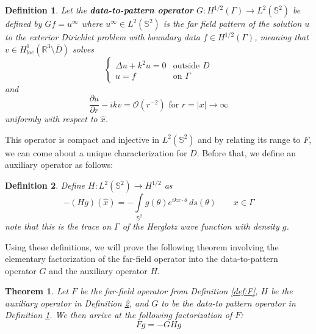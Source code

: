 \documentclass[]{article}
\newtheorem{theorem}{Theorem}
\newtheorem{definition}{Definition}
\newcommand{\bd}{\textbf}
\newcommand{\R}{\mathbb R}
\renewcommand{\S}{\mathbb S}
\begin{document}
				\begin{definition}\label{def:G}
					Let the \bd{data-to-pattern operator} $G: H^{1/2}(\Gamma)\to L^2(\S^2)$ be defined by $Gf = u^\infty$ where $u^\infty \in L^2(\S^2)$ is the far field pattern of the solution $u$ to the exterior Dirichlet problem with boundary data $f\in H^{1/2}(\Gamma)$, meaning that $v\in H^1_{\text{loc}}(\R^3\setminus\bar D)$ solves 
					\begin{equation}
						\begin{cases}
							\Delta u + k^2u = 0 &\text{outside }D \\
							u = f & \text{on } \Gamma
						\end{cases}
					\end{equation}
					and 
					\begin{equation}\label{eq:radiation condition}
						\frac{\partial u}{\partial r} - ikv = \mathcal O(r^{-2}) \text{ for } r = |x| \to \infty
					\end{equation}
					uniformly with respect to $\hat x$.
				\end{definition}				
				This operator is compact and injective in $L^2(\S^2)$ and by relating its range to $F$, we can come about a unique characterization for $D$. Before that, we define an auxiliary operator as follows:
				\begin{definition}\label{def:H}
					Define $H: L^2(\mathbb S^2) \to H^{1/2}$ as
					\begin{equation}
						-(Hg)(\hat x) = -\int\limits_{\mathbb S^2}g(\theta)e^{ikx\cdot \theta}\,ds(\theta) \qquad x\in \Gamma
					\end{equation}
					note that this is the trace on $\Gamma$ of the Herglotz wave function with density $g$.
				\end{definition}
				Using these definitions, we will prove the following theorem involving the elementary factorization of the far-field operator into the data-to-pattern operator $G$ and the auxiliary operator $H$.
				\begin{theorem}\label{theorem:theorem1}
					Let $F$ be the far-field operator from Definition \ref{def:F}, $H$ be the auxiliary operator in Definition \ref{def:H}, and $G$ to be the data-to pattern operator in Definition \ref{def:G}. We then arrive at the following factorization of $F$:
					\begin{equation}
						Fg = -GHg
					\end{equation}
				\end{theorem}
\end{document}
